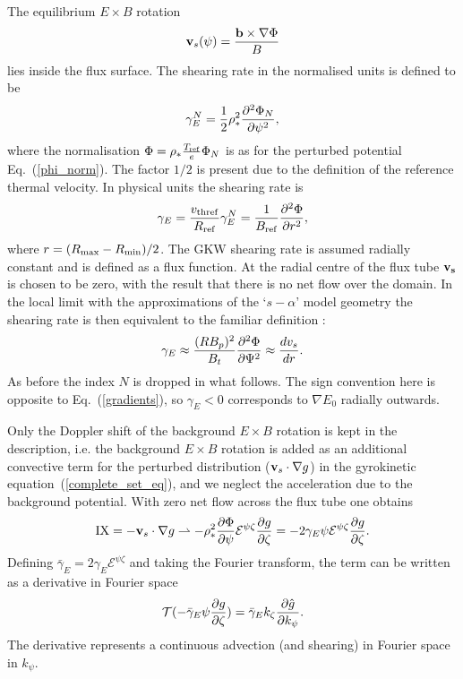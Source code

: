 \documentclass{report}
\def\be{\begin{equation}}
\def\ee{\end{equation}}
\begin{document}
The equilibrium $E \times B$ rotation 
\be
{\bf v}_s(\psi)= {{\bf b} \times \nabla \Phi \over B} 
\ee
lies inside the flux surface.  The shearing rate in the normalised units is defined to be 
\be
\gamma_{E}^N = {1 \over 2}\rho_*^2 {\partial^2 \Phi_N \over \partial \psi^2} ,
\label{gamma_E}
\ee
where the normalisation $\Phi= \rho_* {T_{\rm ref} \over e}\Phi_N$ is as for the
perturbed potential Eq.~(\ref{phi_norm}).  The factor $1/2$ is present due to the definition of the
reference thermal velocity.
In physical units the shearing rate is
\begin{equation}
\gamma_E = {v_{\rm thref} \over R_{\rm ref}} \gamma_E^N = 
{1 \over B_{\rm ref}}{\partial^2 \Phi \over \partial r^2} ,
\end{equation}
where $r=(R_{\rm max}-R_{\rm min})/2$.  The GKW shearing rate is assumed
radially constant and is defined as a flux function.  At the radial centre of the flux tube
$\bf{v_s}$ is chosen to be zero, with the result that there is no net flow over the domain.  In the
local limit with the approximations of the `$s-\alpha$' model geometry
the shearing rate is then equivalent to the familiar definition \cite{Hahm95,Burrell97}:
\begin{equation}
\gamma_E \approx {(RB_p)^2 \over B_t}{\partial^2 \Phi \over \partial \Psi^2}
\approx {d v_s \over d r} .
\end{equation}
As before the index $N$ is dropped in what follows.
The sign convention here is opposite to Eq.~(\ref{gradients}), so $\gamma_E<0$ corresponds to 
$\nabla E_0$ radially outwards.

Only the Doppler shift of the background $E \times B$ rotation is kept in the description, i.e. the
background $E\times B$ rotation is 
added as an additional convective term for the perturbed distribution (${\bf v}_s \cdot \nabla g$) in the gyrokinetic equation~(\ref{complete_set_eq}), 
and we neglect the acceleration due to the background potential.  
With zero net flow across the flux tube one obtains
\be
\label{IX}
{\rm IX} = -{\bf v}_s \cdot \nabla g \rightharpoonup - \rho_*^2 {\partial \Phi \over \partial
\psi}{\mathcal E}^{\psi \zeta}{\partial g \over \partial \zeta} =
 - 2 {\gamma_E \psi}{\mathcal E}^{\psi \zeta}  {\partial g \over \partial \zeta} .
\ee
Defining $\bar \gamma_E= 2 \gamma_E {\mathcal E}^{\psi \zeta} $ and taking the Fourier transform, the term can be written as a derivative in
Fourier space
\be 
{\mathcal T}(-{\bar \gamma_E \psi}{\partial g \over \partial \zeta}) = \bar \gamma_E
k_\zeta {\partial \hat g \over \partial k_\psi} .
\ee
The derivative represents a continuous advection (and shearing) in Fourier space in $k_\psi$.  
\end{document}
